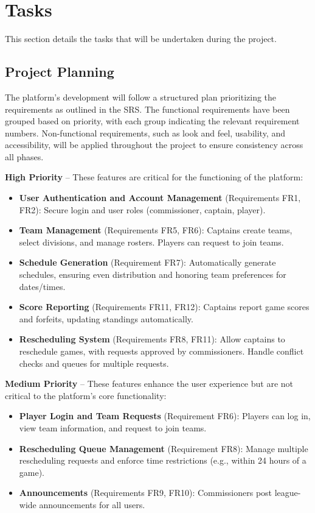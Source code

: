 \documentclass[12pt, titlepage]{article}
\begin{document}
\section{Tasks}
This section details the tasks that will be undertaken during the project.

\subsection{Project Planning}
The platform's development will follow a structured plan prioritizing the requirements as outlined in the SRS. The functional requirements have been grouped based on priority, with each group indicating the relevant requirement numbers. Non-functional requirements, such as look and feel, usability, and accessibility, will be applied throughout the project to ensure consistency across all phases.

\textbf{High Priority} – These features are critical for the functioning of the platform:
\begin{itemize}
    \item \textbf{User Authentication and Account Management} (Requirements FR1, FR2): Secure login and user roles (commissioner, captain, player).
    \item \textbf{Team Management} (Requirements FR5, FR6): Captains create teams, select divisions, and manage rosters. Players can request to join teams.
    \item \textbf{Schedule Generation} (Requirement FR7): Automatically generate schedules, ensuring even distribution and honoring team preferences for dates/times.
    \item \textbf{Score Reporting} (Requirements FR11, FR12): Captains report game scores and forfeits, updating standings automatically.
    \item \textbf{Rescheduling System} (Requirements FR8, FR11): Allow captains to reschedule games, with requests approved by commissioners. Handle conflict checks and queues for multiple requests.
\end{itemize}

\textbf{Medium Priority} – These features enhance the user experience but are not critical to the platform's core functionality:
\begin{itemize}
    \item \textbf{Player Login and Team Requests} (Requirement FR6): Players can log in, view team information, and request to join teams.
    \item \textbf{Rescheduling Queue Management} (Requirement FR8): Manage multiple rescheduling requests and enforce time restrictions (e.g., within 24 hours of a game).
    \item \textbf{Announcements} (Requirements FR9, FR10): Commissioners post league-wide announcements for all users.
\end{itemize}
\end{document}

